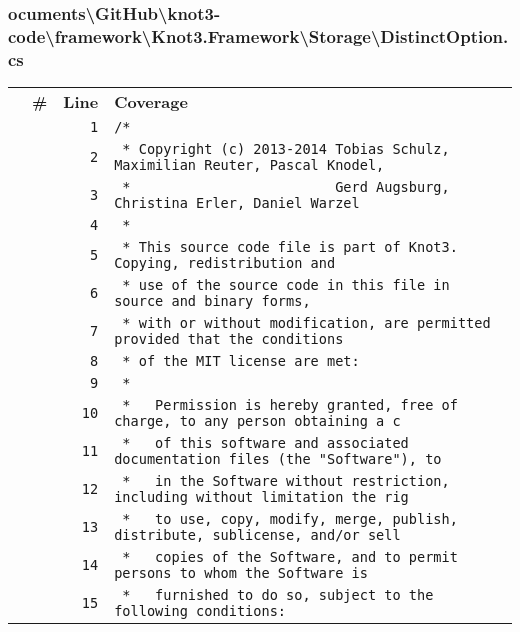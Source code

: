 \documentclass[a4paper,10pt]{article}
\begin{document}
\subsubsection{ocuments\textbackslash GitHub\textbackslash knot3-code\textbackslash framework\textbackslash Knot3.Framework\textbackslash Storage\textbackslash DistinctOption.cs}
\begin{longtable}[l]{lrrl}
\textbf{} & \textbf{\#} & \textbf{Line} & \textbf{Coverage}\\
\cellcolor{gray} &  & \verb~1~ & \verb~/*~\\
\cellcolor{gray} &  & \verb~2~ & \verb~ * Copyright (c) 2013-2014 Tobias Schulz, Maximilian Reuter, Pascal Knodel,~\\
\cellcolor{gray} &  & \verb~3~ & \verb~ *                         Gerd Augsburg, Christina Erler, Daniel Warzel~\\
\cellcolor{gray} &  & \verb~4~ & \verb~ *~\\
\cellcolor{gray} &  & \verb~5~ & \verb~ * This source code file is part of Knot3. Copying, redistribution and~\\
\cellcolor{gray} &  & \verb~6~ & \verb~ * use of the source code in this file in source and binary forms,~\\
\cellcolor{gray} &  & \verb~7~ & \verb~ * with or without modification, are permitted provided that the conditions~\\
\cellcolor{gray} &  & \verb~8~ & \verb~ * of the MIT license are met:~\\
\cellcolor{gray} &  & \verb~9~ & \verb~ *~\\
\cellcolor{gray} &  & \verb~10~ & \verb~ *   Permission is hereby granted, free of charge, to any person obtaining a c~\\
\cellcolor{gray} &  & \verb~11~ & \verb~ *   of this software and associated documentation files (the "Software"), to ~\\
\cellcolor{gray} &  & \verb~12~ & \verb~ *   in the Software without restriction, including without limitation the rig~\\
\cellcolor{gray} &  & \verb~13~ & \verb~ *   to use, copy, modify, merge, publish, distribute, sublicense, and/or sell~\\
\cellcolor{gray} &  & \verb~14~ & \verb~ *   copies of the Software, and to permit persons to whom the Software is~\\
\cellcolor{gray} &  & \verb~15~ & \verb~ *   furnished to do so, subject to the following conditions:~\\

\end{longtable}
\end{document}
